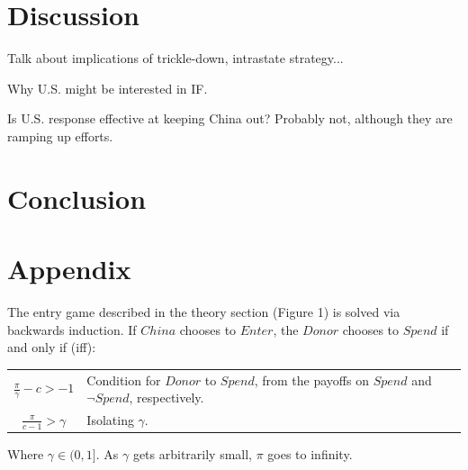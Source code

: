 \documentclass[12pt]{article}
\begin{document}
\section*{Discussion}
Talk about implications of trickle-down, intrastate strategy...

Why U.S. might be interested in IF.

Is U.S. response effective at keeping China out? Probably not, although they are ramping up efforts.

\section*{Conclusion}

\pagebreak
\section*{Appendix}
The entry game described in the theory section (Figure 1) is solved via backwards induction. If $China$ chooses to $Enter$, the $Donor$ chooses to $Spend$ if and only if (iff):

\begin{tabular}{c l}
    $\frac{\pi}{\gamma}-c > -1$ &  Condition for $Donor$ to $Spend$, from the payoffs on $Spend$ and $\neg Spend$, respectively.\\
    $\frac{\pi}{c-1} > \gamma $ & Isolating $\gamma$.\\
\end{tabular}

Where $\gamma \in (0,1]$. As $\gamma$ gets arbitrarily small, $\pi$ goes to infinity. 

\nocite{mechkova2022a}
\nocite{pemstein2022}
\nocite{coppedge2022}
\nocite{coppedge2022a}
\nocite{coppedge2022b}
\nocite{coppedge2022c}
\nocite{coppedge2022d}
\pagebreak
\printbibliography
\end{document}
